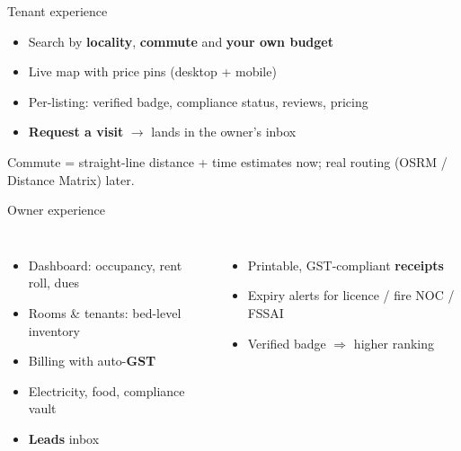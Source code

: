\documentclass[aspectratio=169]{beamer}
\begin{document}
\begin{frame}{Tenant experience}
  \begin{itemize}
    \item Search by \textbf{locality}, \textbf{commute} and \textbf{your own budget}
    \item Live map with price pins (desktop + mobile)
    \item Per-listing: verified badge, compliance status, reviews, pricing
    \item \textbf{Request a visit} $\rightarrow$ lands in the owner's inbox
  \end{itemize}
  \vspace{0.25cm}
  \begin{center}
  \end{center}
  \begin{center}
    {\small Commute = straight-line distance + time estimates now; real routing (OSRM / Distance Matrix) later.}
  \end{center}
\end{frame}

\begin{frame}{Owner experience}
  \begin{columns}
      \begin{itemize}
        \item Dashboard: occupancy, rent roll, dues
        \item Rooms \& tenants: bed-level inventory
        \item Billing with auto-\textbf{GST}
        \item Electricity, food, compliance vault
        \item \textbf{Leads} inbox
      \end{itemize}
      \begin{itemize}
        \item Printable, GST-compliant \textbf{receipts}
        \item Expiry alerts for licence / fire NOC / FSSAI
        \item Verified badge $\Rightarrow$ higher ranking
      \end{itemize}
  \end{columns}
\end{frame}
\end{document}
